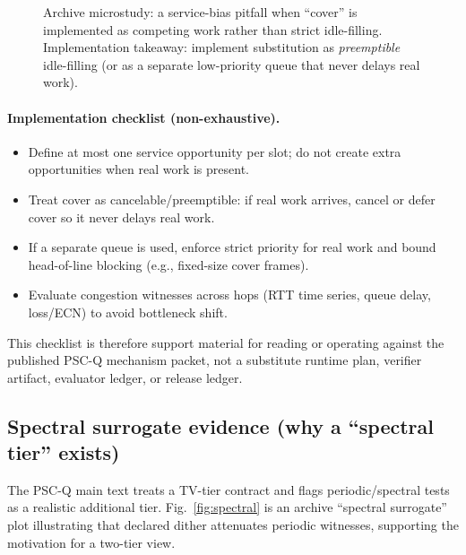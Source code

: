 \documentclass[11pt]{article}
\theoremstyle{definition}
\theoremstyle{remark}
\begin{document}
\begin{figure}[t]
\centering
{}
\caption{Archive microstudy: a service-bias pitfall when ``cover'' is implemented as competing work rather than strict idle-filling.
Implementation takeaway: implement substitution as \emph{preemptible} idle-filling (or as a separate low-priority queue that never delays real work).}
\label{fig:servicebias}
\end{figure}

\paragraph{Implementation checklist (non-exhaustive).}
\begin{itemize}[leftmargin=1.2em]
\item Define at most one service opportunity per slot; do not create extra opportunities when real work is present.
\item Treat cover as cancelable/preemptible: if real work arrives, cancel or defer cover so it never delays real work.
\item If a separate queue is used, enforce strict priority for real work and bound head-of-line blocking (e.g., fixed-size cover frames).
\item Evaluate congestion witnesses across hops (RTT time series, queue delay, loss/ECN) to avoid bottleneck shift.
\end{itemize}
This checklist is therefore support material for reading or operating against the published PSC-Q mechanism packet, not a substitute runtime plan, verifier artifact, evaluator ledger, or release ledger.\cite{series:pscq,series:wcongeq,series:evalnotary,series:opb,series:releaseproperty}

\subsection{Spectral surrogate evidence (why a ``spectral tier'' exists)}
The PSC-Q main text treats a TV-tier contract and flags periodic/spectral tests as a realistic additional tier.
Fig.~\ref{fig:spectral} is an archive ``spectral surrogate'' plot illustrating that declared dither attenuates periodic witnesses,
supporting the motivation for a two-tier view.
\end{document}
